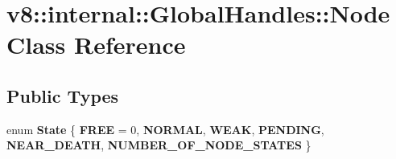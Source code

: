 \hypertarget{classv8_1_1internal_1_1GlobalHandles_1_1Node}{}\section{v8\+:\+:internal\+:\+:Global\+Handles\+:\+:Node Class Reference}
\label{classv8_1_1internal_1_1GlobalHandles_1_1Node}
\subsection*{Public Types}
\begin{DoxyCompactItemize}
\item 
\mbox{\label{classv8_1_1internal_1_1GlobalHandles_1_1Node_ad0e78c1f3196c693801bcac55e643acb}} 
enum {\bfseries State} \{ \newline
{\bfseries F\+R\+EE} = 0, 
{\bfseries N\+O\+R\+M\+AL}, 
{\bfseries W\+E\+AK}, 
{\bfseries P\+E\+N\+D\+I\+NG}, 
\newline
{\bfseries N\+E\+A\+R\+\_\+\+D\+E\+A\+TH}, 
{\bfseries N\+U\+M\+B\+E\+R\+\_\+\+O\+F\+\_\+\+N\+O\+D\+E\+\_\+\+S\+T\+A\+T\+ES}
 \}
\end{DoxyCompactItemize}
